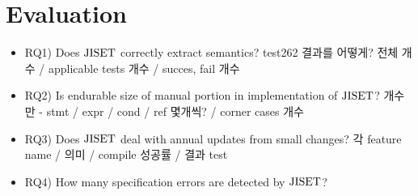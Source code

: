 \section{Evaluation}\label{sec:eval}

\begin{itemize}
  \item RQ1) Does \( \text{JISET} \) correctly extract semantics? 
    test262 결과를 어떻게? 전체 개수 / applicable tests 개수 / succes, fail 개수
  \item RQ2) Is endurable size of manual portion in implementation of \( \text{JISET} \)? 
    개수만 - stmt / expr / cond / ref 몇개씩? / corner cases 개수
  \item RQ3) Does \( \text{JISET} \) deal with annual updates from small changes? 
    각 feature name / 의미 / compile 성공률 / 결과 test
  \item RQ4) How many specification errors are detected by \( \text{JISET} \)? 
\end{itemize}
